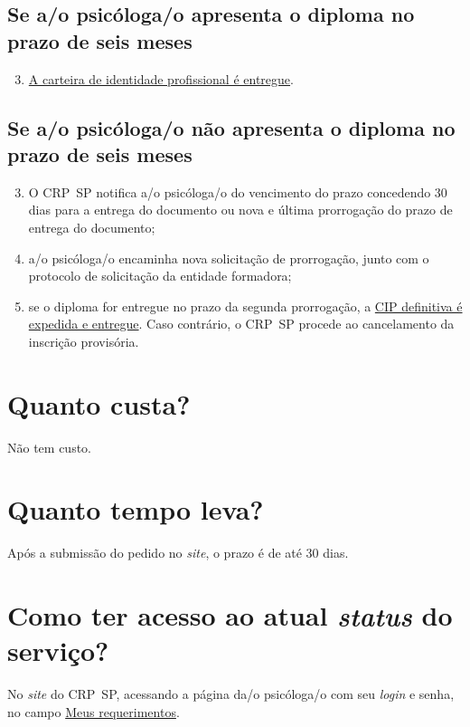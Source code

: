 \subsection{Se a/o psicóloga/o apresenta o diploma no prazo de seis meses}

\begin{enumerate}
	\setcounter{enumi}{2}
	\item
	\hyperref[entrega-da-carteira-de-identidade-profissional-cip]{A
		carteira de identidade profissional é entregue}.
\end{enumerate}

\subsection{Se a/o psicóloga/o não apresenta o diploma no prazo de seis meses}

\begin{enumerate}
	\setcounter{enumi}{2}
	\item
	O CRP~SP notifica a/o psicóloga/o do vencimento do prazo concedendo 30 dias para a entrega do documento ou nova e última prorrogação do prazo de entrega do documento;
	\item
	a/o psicóloga/o encaminha nova solicitação de prorrogação, junto com o protocolo de solicitação da entidade formadora;
	\item
	se o diploma for entregue no prazo da segunda prorrogação, a \hyperref[chap:pf-cip]{CIP definitiva é expedida e entregue}. Caso contrário, o CRP~SP procede ao cancelamento da inscrição provisória.
\end{enumerate}

\section{Quanto custa?}

Não tem custo.

\section{Quanto tempo leva?}

Após a submissão do pedido no \emph{site}, o prazo é de até 30 dias.

\section{Como ter acesso ao atual \emph{status} do serviço?}

No \emph{site} do CRP~SP, acessando a página da/o psicóloga/o com seu \emph{login} e senha, no campo \href{https://cfpsp.brctotal.com/crp06_servicosonline/pgsRequerimento/MeusRequerimentos.aspx}{Meus requerimentos}.

